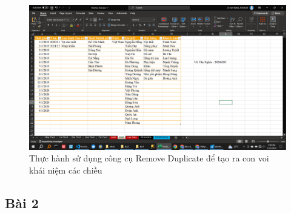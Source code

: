 \documentclass{article}
\begin{document}
\begin{itemize}
\begin{figure}[H]
\centering
\includegraphics[scale = 0.15]{Bai1/ThucHanh/VOI.png}
\caption{Thực hành sử dụng công cụ Remove Duplicate để tạo ra con voi khái niệm các chiều}
\end{figure}

\end{itemize}

\subsection{Bài 2}




\end{document}
